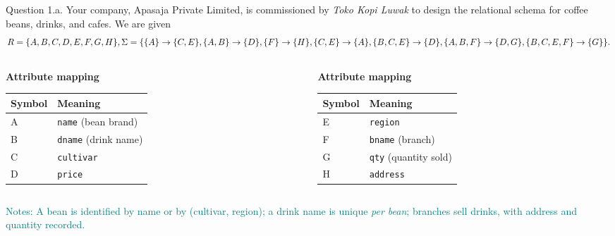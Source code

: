 \documentclass{beamer}
\begin{document}
\begin{frame}[fragile]{Question 1.a.}
\tiny
Your company, Apasaja Private Limited, is commissioned by \emph{Toko Kopi Luwak} to design the relational schema for coffee beans, drinks, and cafes. We are given
\[
R=\{A,B,C,D,E,F,G,H\},\\
\Sigma=\{\{A\} \to \{C,E\},\{A,B\} \to \{D\},\{F\} \to \{H\},\{C,E\} \to \{A\},\{B,C,E\} \to \{D\},\{A,B,F\} \to \{D,G\},\{B,C,E,F\} \to \{G\}\}.
\]

\pause
\footnotesize
\vspace{0.5em}
\begin{columns}
\begin{column}{0.48\textwidth}
\vspace{0.5em}
\textbf{Attribute mapping}\\[-0.2em]
\begin{tabular}{@{}ll@{}}
\toprule
\textbf{Symbol} & \textbf{Meaning} \\
\midrule
A & \texttt{name} (bean brand) \\
B & \texttt{dname} (drink name) \\
C & \texttt{cultivar} \\
D & \texttt{price} \\
\bottomrule
\end{tabular}
\end{column}
\pause
\begin{column}{0.48\textwidth}
\textbf{Attribute mapping}\\[-0.2em]
\begin{tabular}{@{}ll@{}}
\toprule
\textbf{Symbol} & \textbf{Meaning} \\
\midrule
E & \texttt{region} \\
F & \texttt{bname} (branch) \\
G & \texttt{qty} (quantity sold) \\
H & \texttt{address} \\
\bottomrule
\end{tabular}
\end{column}
\end{columns}

\medskip
\scriptsize
\textcolor{teal}{Notes: A bean is identified by \alert{name} or by \alert{(cultivar, region)}; a drink name is unique \emph{per bean}; branches sell drinks, with address and quantity recorded.}
\end{frame}
\end{document}

